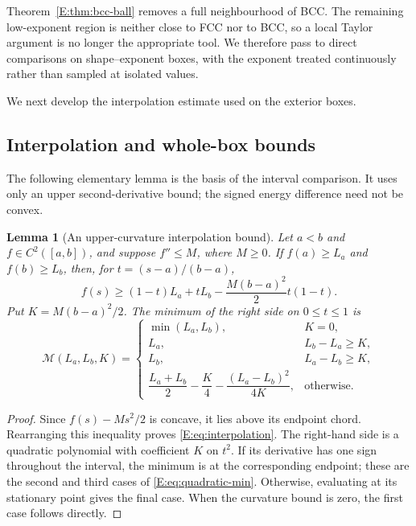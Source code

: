 \documentclass[reqno,english]{amsart}
\newtheorem{lemma}[theorem]{Lemma}
\theoremstyle{definition}
\newtheorem{open problem}[theorem]{Open Problem}
\theoremstyle{remark}
\theoremstyle{plain}
\numberwithin{equation}{section}
\begin{document}
Theorem~\ref{E:thm:bcc-ball} removes a full neighbourhood of BCC. The remaining low-exponent region is neither close to FCC nor to BCC, so a local Taylor argument is no longer the appropriate tool. We therefore pass to direct comparisons on shape--exponent boxes, with the exponent treated continuously rather than sampled at isolated values.

We next develop the interpolation estimate used on the exterior boxes.

\subsection{Interpolation and whole-box bounds}\label{E:sec:exponent-certificate}\label{app:low-boxes}

The following elementary lemma is the basis of the interval
comparison. It uses only an upper second-derivative bound; the signed
energy difference need not be convex.

\begin{lemma}[An upper-curvature interpolation bound]\label{E:lem:interpolation}
Let $a<b$ and $f\in C^2([a,b])$, and suppose $f''\le M$, where $M\ge0$. If $f(a)\ge L_a$ and $f(b)\ge L_b$, then, for $t=(s-a)/(b-a)$,
\begin{equation}
 f(s)\ge (1-t)L_a+tL_b-\frac{M(b-a)^2}{2}t(1-t).
 \label{E:eq:interpolation}
\end{equation}
Put $K=M(b-a)^2/2$. The minimum of the right side on $0\le t\le1$ is
\begin{equation}
 \mathscr M(L_a,L_b,K)=
 \begin{cases}
 \min(L_a,L_b),&K=0,\\
 L_a,&L_b-L_a\ge K,\\
 L_b,&L_a-L_b\ge K,\\
 \dfrac{L_a+L_b}{2}-\dfrac K4-\dfrac{(L_a-L_b)^2}{4K},&\text{otherwise}.
 \end{cases}
 \label{E:eq:quadratic-min}
\end{equation}
\end{lemma}
\begin{proof}
Since $f(s)-Ms^2/2$ is concave, it lies above its endpoint chord.
Rearranging this inequality proves \eqref{E:eq:interpolation}.
The right-hand side is a quadratic polynomial with coefficient $K$
on $t^2$. If its derivative has one sign throughout the interval,
the minimum is at the corresponding endpoint; these are the second
and third cases of \eqref{E:eq:quadratic-min}. Otherwise, evaluating
at its stationary point gives the final case. When the curvature
bound is zero, the first case follows directly.
\end{proof}
\end{document}
